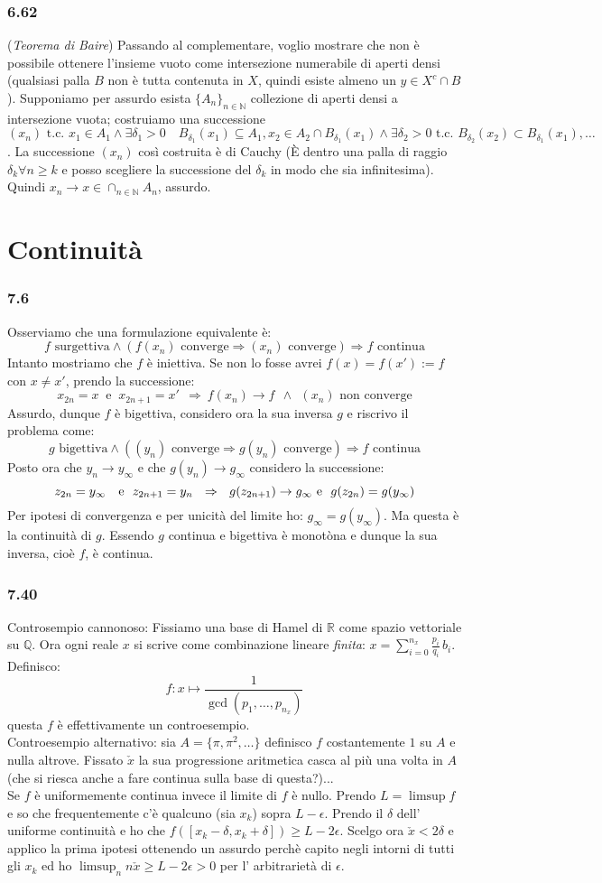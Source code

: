 \documentclass[a4paper,11pt]{article}
\newcommand{\ex}[1]{\subsubsection*{#1}}
\newcommand{\QQ}{\mathbb{Q}}
\newcommand{\NN}{\mathbb{N}}
\newcommand{\RR}{\mathbb{R}}
\newcommand{\tc}{\mbox{ t.c. }}
\begin{document}
\ex{6.62} ({\it Teorema di Baire}) Passando al complementare, voglio mostrare che non è possibile ottenere l'insieme vuoto come intersezione numerabile di aperti densi (qualsiasi palla $B$ non è tutta contenuta in $X$, quindi esiste almeno un $y \in X^c \cap B$). Supponiamo per assurdo esista $\{A_n\}_{n\in\NN}$ collezione di aperti densi a intersezione vuota; costruiamo una successione $(x_n) \tc x_1 \in A_1 \wedge \exists \delta_1 > 0 \quad B_{\delta_1}(x_1) \subseteq A_1, x_2 \in A_2 \cap B_{\delta_1}(x_1) \wedge \exists \delta_2 > 0 \tc B_{\delta_2}(x_2) \subset B_{\delta_1}(x_1), \ldots $. La successione $(x_n)$ così costruita è di Cauchy (\`E dentro una palla di raggio $\delta_k \forall n \ge k$ e posso scegliere la successione del $\delta_k$ in modo che sia infinitesima). Quindi $x_n \rightarrow x \in \cap_{n\in\NN} A_n$, assurdo.
\section{Continuità}
\ex{7.6} Osserviamo che una formulazione equivalente è:
$$
f\mbox{ surgettiva} \wedge \left( f(x_n)\mbox{ converge} \Rightarrow (x_n) \mbox{ converge} \right) \Rightarrow f \mbox{ continua}
$$
Intanto mostriamo che $f$ è iniettiva. Se non lo fosse avrei $f(x)=f(x'):=f$ con $x\neq x'$, prendo la successione:
$$
x_{2n}=x\ \mbox{ e }\ x_{2n+1}=x'\ \ \Rightarrow\ f(x_n)\rightarrow f\ \  \wedge\ \ (x_n) \mbox{ non converge}
$$
Assurdo, dunque $f$ è bigettiva, considero ora la sua inversa $g$ e riscrivo il problema come:
$$
g\mbox{ bigettiva} \wedge \left( (y_n)\mbox{ converge} \Rightarrow g(y_n) \mbox{ converge} \right) \Rightarrow f \mbox{ continua}
$$
Posto ora che $y_n\rightarrow y_{\infty}$ e che $g(y_n)\rightarrow g_{\infty}$ considero la successione:
$$
z_{2n}=y_{\infty}\ \ \mbox{ e}\ \ z_{2n+1}=y_n\ \ \Rightarrow\ \ g(z_{2n+1})\rightarrow g_{\infty}\\ \mbox{ e}\  \ g(z_{2n})=g(y_{\infty})
$$
Per ipotesi di convergenza e per unicità del limite ho: $ g_{\infty}=g(y_{\infty})$. Ma questa è la continuità di $g$. Essendo $g$ continua e bigettiva è monotòna e dunque la sua inversa, cioè $f$, è continua.
\ex{7.40}Controsempio cannonoso: Fissiamo una base di Hamel di $\RR$ come spazio vettoriale su $\QQ$. Ora ogni reale $x$ si scrive come combinazione lineare {\it finita}: $x=\sum_{i=0}^{n_x} \frac{p_i}{q_i}\, b_i$. Definisco:
$$
f:x\mapsto \frac{1}{\gcd(p_1,\ldots,p_{n_x})}
$$ 
questa $f$ è effettivamente un controesempio.\\
Controesempio alternativo: sia $A=\{\pi,\pi^2,\ldots\}$ definisco $f$ costantemente $1$ su $A$ e nulla altrove. Fissato $\check{x}$ la sua progressione aritmetica casca al più una volta in $A$ (che si riesca anche a fare continua sulla base di questa?)...\\
Se $f$ è uniformemente continua invece il limite di $f$ è nullo. Prendo $L=\limsup f$ e so che frequentemente c'è qualcuno (sia $x_k$) sopra $L-\epsilon$. Prendo il $\delta$ dell' uniforme continuità e ho che $f([x_k-\delta,x_k+\delta])\ge L-2\epsilon$. Scelgo ora $\check{x}<2\delta$ e applico la prima ipotesi ottenendo un assurdo perchè capito negli intorni di tutti gli $x_k$ ed ho $\limsup_n n\check{x}\ge L-2\epsilon>0$ per l' arbitrarietà di $\epsilon$.
 
\end{document}
